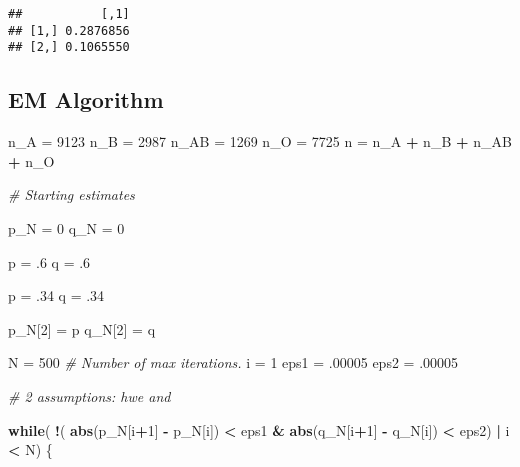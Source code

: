 \documentclass[]{article}
\newenvironment{Shaded}{\begin{snugshade}}{\end{snugshade}}
\newcommand{\KeywordTok}[1]{\textcolor[rgb]{0.13,0.29,0.53}{\textbf{#1}}}
\newcommand{\DecValTok}[1]{\textcolor[rgb]{0.00,0.00,0.81}{#1}}
\newcommand{\StringTok}[1]{\textcolor[rgb]{0.31,0.60,0.02}{#1}}
\newcommand{\CommentTok}[1]{\textcolor[rgb]{0.56,0.35,0.01}{\textit{#1}}}
\newcommand{\ControlFlowTok}[1]{\textcolor[rgb]{0.13,0.29,0.53}{\textbf{#1}}}
\newcommand{\OperatorTok}[1]{\textcolor[rgb]{0.81,0.36,0.00}{\textbf{#1}}}
\newcommand{\NormalTok}[1]{#1}
\begin{document}
\begin{verbatim}
##           [,1]
## [1,] 0.2876856
## [2,] 0.1065550
\end{verbatim}

\subsection{EM Algorithm}\label{em-algorithm}

\begin{Shaded}
\begin{Highlighting}[]
\NormalTok{n_A =}\StringTok{ }\DecValTok{9123}
\NormalTok{n_B =}\StringTok{ }\DecValTok{2987}
\NormalTok{n_AB =}\StringTok{ }\DecValTok{1269}
\NormalTok{n_O =}\StringTok{ }\DecValTok{7725}
\NormalTok{n =}\StringTok{ }\NormalTok{n_A }\OperatorTok{+}\StringTok{ }\NormalTok{n_B }\OperatorTok{+}\StringTok{ }\NormalTok{n_AB }\OperatorTok{+}\StringTok{ }\NormalTok{n_O}

\CommentTok{# Starting estimates}

\NormalTok{p_N =}\StringTok{ }\DecValTok{0}
\NormalTok{q_N =}\StringTok{ }\DecValTok{0}

\NormalTok{p =}\StringTok{ }\NormalTok{.}\DecValTok{6}
\NormalTok{q =}\StringTok{ }\NormalTok{.}\DecValTok{6}

\NormalTok{p =}\StringTok{ }\NormalTok{.}\DecValTok{34}
\NormalTok{q =}\StringTok{ }\NormalTok{.}\DecValTok{34}

\NormalTok{p_N[}\DecValTok{2}\NormalTok{] =}\StringTok{ }\NormalTok{p}
\NormalTok{q_N[}\DecValTok{2}\NormalTok{] =}\StringTok{ }\NormalTok{q}

\NormalTok{N =}\StringTok{ }\DecValTok{500} \CommentTok{# Number of max iterations.}
\NormalTok{i =}\StringTok{ }\DecValTok{1}
\NormalTok{eps1 =}\StringTok{ }\NormalTok{.}\DecValTok{00005}
\NormalTok{eps2 =}\StringTok{ }\NormalTok{.}\DecValTok{00005}

\CommentTok{# 2 assumptions: hwe and }

\ControlFlowTok{while}\NormalTok{( }\OperatorTok{!}\NormalTok{( }\KeywordTok{abs}\NormalTok{(p_N[i}\OperatorTok{+}\DecValTok{1}\NormalTok{] }\OperatorTok{-}\StringTok{ }\NormalTok{p_N[i]) }\OperatorTok{<}\StringTok{ }\NormalTok{eps1 }\OperatorTok{&}\StringTok{ }\KeywordTok{abs}\NormalTok{(q_N[i}\OperatorTok{+}\DecValTok{1}\NormalTok{] }\OperatorTok{-}\StringTok{ }\NormalTok{q_N[i]) }\OperatorTok{<}\StringTok{ }\NormalTok{eps2) }\OperatorTok{|}\StringTok{ }\NormalTok{i }\OperatorTok{<}\StringTok{ }\NormalTok{N) \{ }
      

\end{Highlighting}
\end{Shaded}
\end{document}
